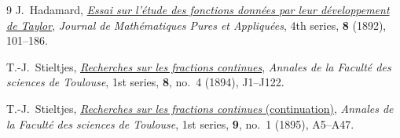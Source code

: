 \documentclass[
  paper=b5,
  fontsize=13pt,
  twoside,
  headings=normal,
  bookmarkpackage=false
]{scrartcl}
\theoremstyle{stieltjesplain}
\theoremstyle{stieltjesdefinition}
\begin{document}
\begin{thebibliography}{9}
J.~Hadamard,
\href{https://www.numdam.org/item/JMPA_1892_4_8__101_0/}
{\emph{Essai sur l'étude des fonctions données par leur développement de Taylor}},
\emph{Journal de Mathématiques Pures et Appliquées}, 4th series,
\textbf{8} (1892), 101--186.

T.-J.~Stieltjes,
\href{https://doi.org/10.5802/afst.108}
{\emph{Recherches sur les fractions continues}},
\emph{Annales de la Faculté des sciences de Toulouse}, 1st series,
\textbf{8}, no.~4 (1894), J1--J122.

T.-J.~Stieltjes,
\href{https://doi.org/10.5802/afst.109}
{\emph{Recherches sur les fractions continues} (continuation)},
\emph{Annales de la Faculté des sciences de Toulouse}, 1st series,
\textbf{9}, no.~1 (1895), A5--A47.

\end{thebibliography}
\end{document}
